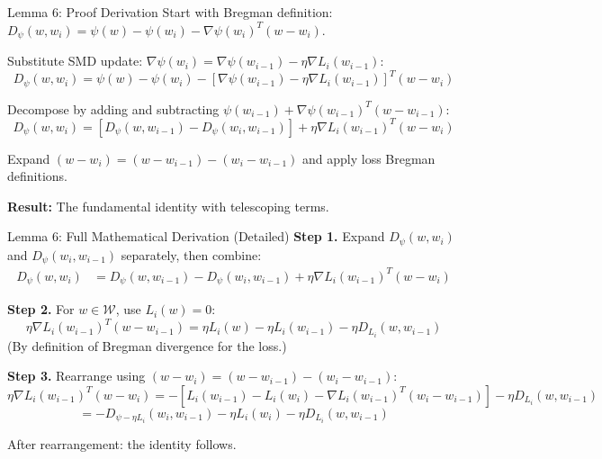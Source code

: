 \documentclass[aspectratio=169]{beamer}
\begin{document}
\begin{frame}{Lemma 6: Proof Derivation}
    \vspace{-0.25cm}
    Start with Bregman definition: $D_\psi(w, w_i) = \psi(w) - \psi(w_i) - \nabla\psi(w_i)^T(w - w_i)$.
    
    \vspace{0.08cm}
    Substitute SMD update: $\nabla\psi(w_i) = \nabla\psi(w_{i-1}) - \eta\nabla L_i(w_{i-1})$:
    $$D_\psi(w, w_i) = \psi(w) - \psi(w_i) - [\nabla\psi(w_{i-1}) - \eta\nabla L_i(w_{i-1})]^T(w-w_i)$$
    
    \vspace{0.08cm}
    Decompose by adding and subtracting $\psi(w_{i-1}) + \nabla\psi(w_{i-1})^T(w-w_{i-1})$:
    $$D_\psi(w,w_i) = [D_\psi(w,w_{i-1}) - D_\psi(w_i,w_{i-1})] + \eta\nabla L_i(w_{i-1})^T(w-w_i)$$
    
    \vspace{0.08cm}
    Expand $(w-w_i)=(w-w_{i-1})-(w_i-w_{i-1})$ and apply loss Bregman definitions.
    
    \vspace{0.08cm}
    \textbf{Result:} The fundamental identity with telescoping terms.
\end{frame}

\begin{frame}{Lemma 6: Full Mathematical Derivation (Detailed)}
    \vspace{-0.25cm}
    \textbf{Step 1.} Expand $D_\psi(w,w_i)$ and $D_\psi(w_i,w_{i-1})$ separately, then combine:
    \begin{align}
    D_\psi(w,w_i) &= D_\psi(w,w_{i-1}) - D_\psi(w_i,w_{i-1}) + \eta\nabla L_i(w_{i-1})^T(w-w_i)
    \end{align}
    
    \vspace{0.08cm}
    \textbf{Step 2.} For $w \in \mathcal{W}$, use $L_i(w) = 0$:
    $$\eta\nabla L_i(w_{i-1})^T(w-w_{i-1}) = \eta L_i(w) - \eta L_i(w_{i-1}) - \eta D_{L_i}(w,w_{i-1})$$
    (By definition of Bregman divergence for the loss.)
    
    \vspace{0.08cm}
    \textbf{Step 3.} Rearrange using $(w-w_i) = (w-w_{i-1})-(w_i-w_{i-1})$:
    $$\eta\nabla L_i(w_{i-1})^T(w-w_i) = -[L_i(w_{i-1})-L_i(w_i)-\nabla L_i(w_{i-1})^T(w_i-w_{i-1})] - \eta D_{L_i}(w,w_{i-1})$$
    $$= -D_{\psi-\eta L_i}(w_i,w_{i-1}) - \eta L_i(w_i) - \eta D_{L_i}(w,w_{i-1})$$
    
    \vspace{0.08cm}
    After rearrangement: the identity follows.
\end{frame}
\end{document}

